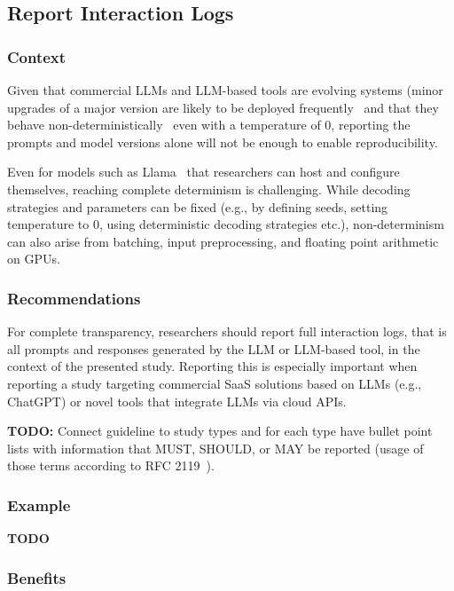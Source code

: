 \documentclass[11pt]{article}
\begin{document}
\subsection{Report Interaction Logs}

\subsubsection{Context}

Given that commercial LLMs and LLM-based tools are evolving systems (minor upgrades of a major version are likely to be deployed frequently~\cite{DBLP:journals/corr/abs-2307-09009} and that they behave non-deterministically~\cite{Chann2023} even with a temperature of 0, reporting the prompts and model versions alone will not be enough to enable reproducibility.

Even for models such as Llama~\cite{Meta2025} that researchers can host and configure themselves, reaching complete determinism is challenging.
While decoding strategies and parameters can be fixed (e.g., by defining seeds, setting temperature to 0, using deterministic decoding strategies etc.), non-determinism can also arise from batching, input preprocessing, and floating point arithmetic on GPUs.


\subsubsection{Recommendations}

For complete transparency, researchers should report full interaction logs, that is all prompts and responses generated by the LLM or LLM-based tool, in the context of the presented study.
Reporting this is especially important when reporting a study targeting commercial SaaS solutions based on LLMs (e.g., ChatGPT) or novel tools that integrate LLMs via cloud APIs.

\textbf{TODO:} Connect guideline to study types and for each type have bullet point lists with information that MUST, SHOULD, or MAY be reported (usage of those terms according to RFC 2119~\cite{rfc2119}).

\subsubsection{Example}

\textbf{TODO}

\subsubsection{Benefits}
\end{document}
